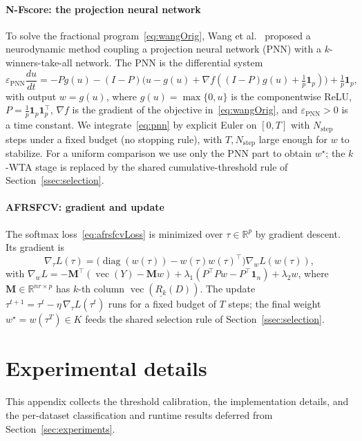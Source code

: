 \documentclass[]{interact}
\theoremstyle{plain}
\theoremstyle{definition}
\theoremstyle{remark}
\newcommand{\R}{\mathbb{R}}
\DeclareMathOperator{\diag}{diag}
\DeclareMathOperator{\vecop}{vec}
\begin{document}
\paragraph*{N-Fscore: the projection neural network}
To solve the fractional program~\eqref{eq:wangOrig}, Wang et al.~\citep{wang2021fractional} proposed a neurodynamic method coupling a projection neural network (PNN) with a $k$-winners-take-all network. The PNN is the differential system
\begin{equation}\label{eq:pnn}
\varepsilon_{\mathrm{PNN}}\frac{du}{dt}=-Pg(u)-(I-P)\bigl(u-g(u)+\nabla f((I-P)g(u)+\tfrac1p\mathbf{1}_p)\bigr)+\tfrac1p\mathbf{1}_p,
\end{equation}
with output $w=g(u)$, where $g(u)=\max\{0,u\}$ is the componentwise ReLU, $P=\tfrac1p\mathbf{1}_p\mathbf{1}_p^{\top}$, $\nabla f$ is the gradient of the objective in~\eqref{eq:wangOrig}, and $\varepsilon_{\mathrm{PNN}}>0$ is a time constant. We integrate~\eqref{eq:pnn} by explicit Euler on $[0,T]$ with $N_{\mathrm{step}}$ steps under a fixed budget (no stopping rule), with $T,N_{\mathrm{step}}$ large enough for $w$ to stabilize. For a uniform comparison we use only the PNN part to obtain $w^\star$; the $k$-WTA stage is replaced by the shared cumulative-threshold rule of Section~\ref{ssec:selection}.

\paragraph*{AFRSFCV: gradient and update}
The softmax loss~\eqref{eq:afrsfcvLoss} is minimized over $\tau\in\R^p$ by gradient descent. Its gradient is
\begin{equation}\label{eq:gradTau}
\nabla_\tau L(\tau)=\bigl(\diag(w(\tau))-w(\tau)w(\tau)^{\top}\bigr)\nabla_w L(w(\tau)),
\end{equation}
with $\nabla_w L=-\mathbf{M}^{\top}(\vecop(Y)-\mathbf{M}w)+\lambda_1(P^{\top}Pw-P^{\top}\mathbf{1}_n)+\lambda_2 w$, where $\mathbf{M}\in\R^{nr\times p}$ has $k$-th column $\vecop(\underline{R_k}(D))$. The update $\tau^{t+1}=\tau^t-\eta\,\nabla_\tau L(\tau^t)$ runs for a fixed budget of $T$ steps; the final weight $w^\star=w(\tau^T)\in K$ feeds the shared selection rule of Section~\ref{ssec:selection}.


\section{Experimental details}\label{app:exp-details}
This appendix collects the threshold calibration, the implementation details, and the per-dataset classification and runtime results deferred from Section~\ref{sec:experiments}.
\end{document}

